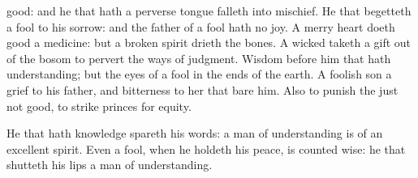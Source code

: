 {good: and he that hath a
perverse
tongue
falleth into
mischief.
He that
begetteth a
fool
{} to his
sorrow: and the
father of a
fool hath no
joy.
A
merry
heart doeth
good
{} a
medicine: but a
broken
spirit
drieth the
bones.
A
wicked
{}
taketh a
gift out of the
bosom to
pervert the
ways of
judgment.
Wisdom
{} before him that hath
understanding; but the
eyes of a
fool
{} in the
ends of the
earth.
A
foolish
son
{} a
grief to his
father, and
bitterness to her that
bare him.
Also to
punish the
just
{} not
good,
{} to
strike
princes for
equity.
\par }{\PP {}He that
hath
knowledge
spareth his
words:
{} a
man of
understanding is of an
excellent
spirit.
Even a
fool, when he holdeth his
peace, is
counted
wise:
{} he that
shutteth his
lips
{} a man of
understanding.

}
